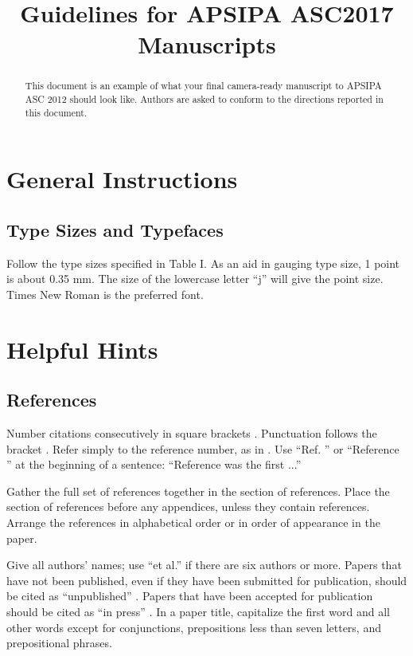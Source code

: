 \documentclass[dvipdfmx,conference,a4paper,nofonttune]{APSIPA}
\title{Guidelines for APSIPA ASC2017 Manuscripts}
\author{%
   \IEEEauthorblockN{Takanori Fujisawa, Masaaki Ikehara}
   \IEEEauthorblockA{EEE Dept., Keio Univ., Yokohama, Kanagawa 223-8522, Japan\\
   Email: \texttt{\url{{fujisawa,ikehara}@tkhm.elec.keio.ac.jp}}}
}
\begin{document}
\maketitle
\thispagestyle{empty}

\begin{abstract}
This document is an example of what your final camera-ready
manuscript to APSIPA ASC 2012 should look like.  Authors are asked
to conform to the directions reported in this document.
\end{abstract}

\section{General Instructions}

\subsection{Type Sizes and Typefaces}
Follow the type sizes specified in Table I.  As an aid in gauging type
size, 1 point is about 0.35 mm.  The size of the lowercase letter
``j'' will give the point size.  Times New Roman is the preferred
font.

\section{Helpful Hints}

\subsection{References}
Number citations consecutively in square brackets \cite{Eason1955}.  Punctuation
follows the bracket \cite{Maxwell1892}. Refer simply to the reference number, as in
\cite{Jacobs1963}. Use ``Ref. \cite{Jacobs1963}'' or ``Reference \cite{Jacobs1963}'' at the beginning of a
sentence: ``Reference \cite{Jacobs1963} was the first ...''


Gather the full set of references together in the section of
references.  Place the section of references before any appendices,
unless they contain references.  Arrange the references in
alphabetical order or in order of appearance in the paper.

Give all authors' names; use ``et al.''  if there are six authors or
more.  Papers that have not been published, even if they have been
submitted for publication, should be cited as ``unpublished'' \cite{Elissa}.
Papers that have been accepted for publication should be cited as ``in
press'' \cite{Nicole}.  In a paper title, capitalize the first word and all
other words except for conjunctions, prepositions less than seven
letters, and prepositional phrases.
\end{document}
